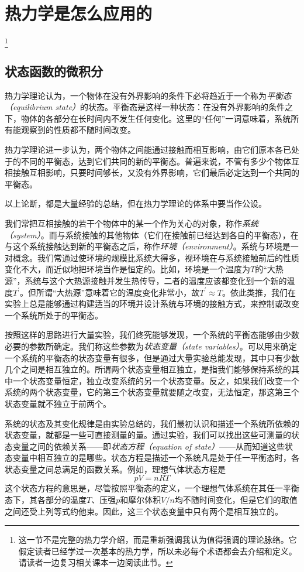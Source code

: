 \documentclass[main.tex]{subfiles}
\begin{document}
\section{热力学是怎么应用的}\footnote{这一节不是完整的热力学介绍，而是重新强调我认为值得强调的理论脉络。它假定读者已经学过一次基本的热力学，所以未必每个术语都会去介绍和定义。请读者一边复习相关课本一边阅读此节。}\label{I.2 pratical_thermodynamics}
\subsection{状态函数的微积分}
热力学理论认为，一个物体在没有外界影响的条件下必将趋近于一个称为\emph{平衡态（equilibrium state）}的状态。平衡态是这样一种状态：在没有外界影响的条件之下，物体的各部分在长时间内不发生任何变化。这里的“任何”一词意味着，系统所有能观察到的性质都不随时间改变。

热力学理论进一步认为，两个物体之间能通过接触而相互影响，由它们原本各已处于的不同的平衡态，达到它们共同的新的平衡态。普遍来说，不管有多少个物体互相接触互相影响，只要时间够长，又没有外界影响，它们最后必定达到一个共同的平衡态。

以上论断，都是大量经验的总结，但在热力学理论的体系中要当作公设。

我们常把互相接触的若干个物体中的某一个作为关心的对象，称作\emph{系统（system）}。而与系统接触的其他物体（它们在接触前已经达到各自的平衡态），在与这个系统接触达到新的平衡态之后，称作\emph{环境（environment）}。系统与环境是一对概念。我们常通过使环境的规模比系统大得多，视环境在与系统接触前后的性质变化不大，而近似地把环境当作是恒定的。比如，环境是一个温度为$T$的“大热源”，系统与这个大热源接触并发生热传导，二者的温度应该都变化到一个新的温度$T^\prime$。但所谓“大热源”意味着它的温度变化非常小，故$T^\prime\approx T$。依此类推，我们在实验上总是能够通过构建适当的环境并设计系统与环境的接触方式，来控制或改变一个系统所处于的平衡态。

按照这样的思路进行大量实验，我们终究能够发现，一个系统的平衡态能够由少数必要的参数所确定。我们称这些参数为\emph{状态变量（state variables）}。可以用来确定一个系统的平衡态的状态变量有很多，但是通过大量实验总能发现，其中只有少数几个之间是相互独立的。所谓两个状态变量相互独立，是指我们能够保持系统的其中一个状态变量恒定，独立改变系统的另一个状态变量。反之，如果我们改变一个系统的两个状态变量，它的第三个状态变量就要随之改变，无法恒定，那这第三个状态变量就不独立于前两个。

系统的状态及其变化规律是由实验总结的，我们最初认识和描述一个系统所依赖的状态变量，就都是一些可直接测量的量。通过实验，我们可以找出这些可测量的状态变量之间的依赖关系——即\emph{状态方程（equation of state）}——从而知道这些状态变量中相互独立的是哪些。状态方程是描述一个系统凡是处于任一平衡态时，各状态变量之间总满足的函数关系。例如，理想气体状态方程是
\[pV=nRT\]
这个状态方程的意思是，尽管按照平衡态的定义，一个理想气体系统在其任一平衡态下，其各部分的温度$T$、压强$p$和摩尔体积$V/n$均不随时间变化，但是它们的取值之间还受上列等式约他束。因此，这三个状态变量中只有两个是相互独立的。
\end{document}
